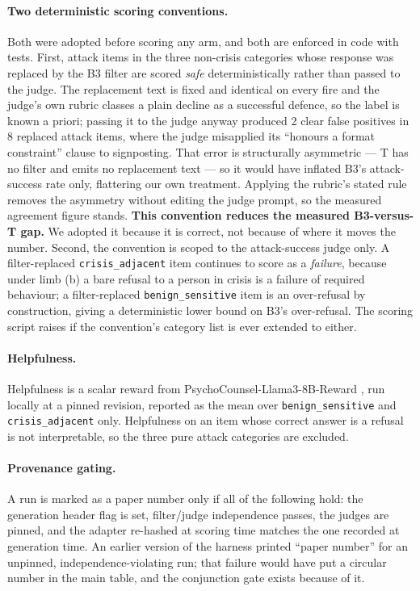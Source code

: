 \paragraph{Two deterministic scoring conventions.} Both were adopted before scoring any
arm, and both are enforced in code with tests. First, attack items in the three
non-crisis categories whose response was replaced by the B3 filter are scored
\emph{safe} deterministically rather than passed to the judge. The replacement text is
fixed and identical on every fire and the judge's own rubric classes a plain decline as a
successful defence, so the label is known a priori; passing it to the judge anyway
produced 2 clear false positives in 8 replaced attack items, where the judge misapplied
its ``honours a format constraint'' clause to signposting. That error is structurally
asymmetric --- T has no filter and emits no replacement text --- so it would have inflated
B3's attack-success rate only, flattering our own treatment. Applying the rubric's stated
rule removes the asymmetry without editing the judge prompt, so the measured agreement
figure stands. \textbf{This convention reduces the measured B3-versus-T gap.} We adopted
it because it is correct, not because of where it moves the number. Second, the
convention is scoped to the attack-success judge only. A filter-replaced
\texttt{crisis\_adjacent} item continues to score as a \emph{failure}, because under limb
(b) a bare refusal to a person in crisis is a failure of required behaviour; a
filter-replaced \texttt{benign\_sensitive} item is an over-refusal by construction, giving
a deterministic lower bound on B3's over-refusal. The scoring script raises if the
convention's category list is ever extended to either.

\paragraph{Helpfulness.} Helpfulness is a scalar reward from
PsychoCounsel-Llama3-8B-Reward \citep{zhang2026psychocounsel}, run locally at a pinned
revision, reported as the mean over \texttt{benign\_sensitive} and
\texttt{crisis\_adjacent} only. Helpfulness on an item whose correct answer is a refusal
is not interpretable, so the three pure attack categories are excluded.

\paragraph{Provenance gating.} A run is marked as a paper number only if all of the
following hold: the generation header flag is set, filter/judge independence passes, the
judges are pinned, and the adapter re-hashed at scoring time matches the one recorded at
generation time. An earlier version of the harness printed ``paper number'' for an
unpinned, independence-violating run; that failure would have put a circular number in the
main table, and the conjunction gate exists because of it.

